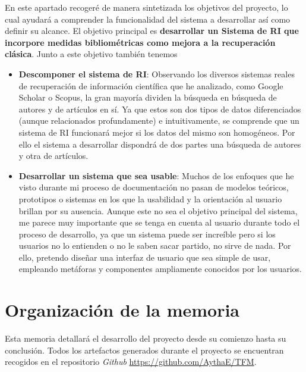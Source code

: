 En este apartado recogeré de manera sintetizada los objetivos del proyecto, lo cual ayudará a comprender la funcionalidad del sistema a desarrollar así como definir su alcance. El objetivo principal es \textbf{desarrollar un Sistema de \acrlong{RI} que incorpore medidas bibliométricas como mejora a la recuperación clásica}. Junto a este objetivo también tenemos 

\begin{itemize}

	
	\item \textbf{Descomponer el sistema de \acrshort{RI}}: Observando los diversos sistemas reales de recuperación de información científica que he analizado, como Google Scholar o Scopus, la gran mayoría dividen la búsqueda en búsqueda de autores y de artículos en sí. Ya que estos son dos tipos de datos diferenciados (aunque relacionados profundamente) e intuitivamente, se comprende que un sistema de RI funcionará mejor si los datos del mismo son homogéneos. Por ello el sistema a desarrollar dispondrá de dos partes una búsqueda de autores y otra de artículos.
	
	\item \textbf{Desarrollar un sistema que sea usable}: Muchos de los enfoques que he visto durante mi proceso de documentación no pasan de modelos teóricos, prototipos o sistemas en los que la usabilidad y la orientación al usuario brillan por su ausencia. Aunque este no sea el objetivo principal del sistema, me parece muy importante que se tenga en cuenta al usuario durante todo el proceso de desarrollo, ya que un sistema puede ser increíble pero si los usuarios no lo entienden o no le saben sacar partido, no sirve de nada. Por ello, pretendo diseñar una interfaz de usuario que sea simple de usar, empleando metáforas y componentes ampliamente conocidos por los usuarios.

\end{itemize}


\section{Organización de la memoria}

Esta memoria detallará el desarrollo del proyecto desde su comienzo hasta su conclusión. Todos los artefactos generados durante el proyecto se encuentran recogidos en el repositorio \textit{Github} \url{https://github.com/AythaE/TFM}.

